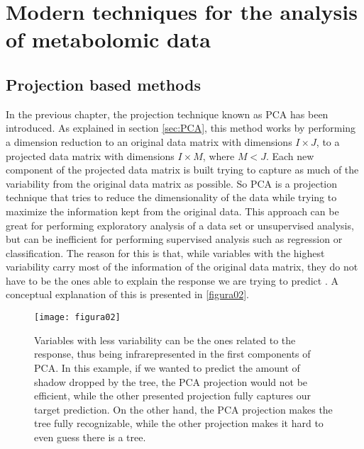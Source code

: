 
\chapter[Modern techniques for the analysis of metabolomic data]{Modern techniques for the analysis of metabolomic data}
\label{chapter:modern_techniques}


\section{Projection based methods}
\label{projectionmethods}
In the previous chapter, the projection technique known as PCA has been introduced. As explained in section \ref{sec:PCA}, this method works by performing a dimension reduction to an original data matrix with dimensions $I \times J$, to a projected data matrix with dimensions $I \times M$, where $M<J$. Each new component of the projected data matrix is built trying to capture as much of the variability from the original data matrix as possible. So PCA is a projection technique that tries to reduce the dimensionality of the data while trying to maximize the information kept from the original data. This approach can be great for performing exploratory analysis of a data set or unsupervised analysis, but can be inefficient for performing supervised analysis such as regression or classification. The reason for this is that, while variables with the highest variability carry most of the information of the original data matrix, they do not have to be the ones able to explain the response we are trying to predict \parencite{kettaneh2005pca}. A conceptual explanation of this is presented in \autoref{figura02}.

\begin{figure}[htbp]\centering
		\texttt{[image: figura02]}
		\caption[Differences between PCA and PLS]{Variables with less variability can be the ones related to the response, thus being infrarepresented in the first components of PCA. In this example, if we wanted to predict the amount of shadow dropped by the tree, the PCA projection would not be efficient, while the other presented projection fully captures our target prediction. On the other hand, the PCA projection makes the tree fully recognizable, while the other projection makes it hard to even guess there is a tree.}
		\label{figura02}
	\end{figure}

